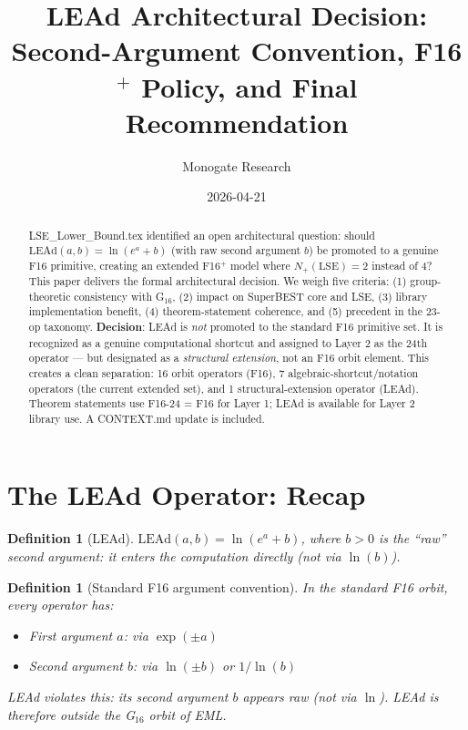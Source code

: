 \documentclass[11pt]{article}
\title{LEAd Architectural Decision:\\
Second-Argument Convention, F16$^+$ Policy, and Final Recommendation}
\author{Monogate Research}
\date{2026-04-21}
\newtheorem{definition}[theorem]{Definition}
\begin{document}
\maketitle

\begin{abstract}
LSE\_Lower\_Bound.tex identified an open architectural question:
should $\mathrm{LEAd}(a,b) = \ln(e^a + b)$ (with raw second argument $b$)
be promoted to a genuine F16 primitive, creating an extended F16$^+$ model
where $N_+(\mathrm{LSE}) = 2$ instead of 4?
This paper delivers the formal architectural decision.
We weigh five criteria: (1) group-theoretic consistency with G$_{16}$,
(2) impact on SuperBEST core and LSE, (3) library implementation benefit,
(4) theorem-statement coherence, and (5) precedent in the 23-op taxonomy.
\textbf{Decision}: LEAd is \emph{not} promoted to the standard F16 primitive set.
It is recognized as a genuine computational shortcut and assigned to Layer 2
as the 24th operator — but designated as a \emph{structural extension}, not an
F16 orbit element. This creates a clean separation: 16 orbit operators (F16),
7 algebraic-shortcut/notation operators (the current extended set), and 1
structural-extension operator (LEAd). Theorem statements use F16-24 = F16 for
Layer 1; LEAd is available for Layer 2 library use.
A CONTEXT.md update is included.
\end{abstract}

\section{The LEAd Operator: Recap}

\begin{definition}[LEAd]
$\mathrm{LEAd}(a, b) = \ln(e^a + b)$, where $b > 0$ is the ``raw'' second argument:
it enters the computation directly (not via $\ln(b)$).
\end{definition}

\begin{definition}[Standard F16 argument convention]
In the standard F16 orbit, every operator has:
\begin{itemize}
  \item First argument $a$: via $\exp(\pm a)$
  \item Second argument $b$: via $\ln(\pm b)$ or $1/\ln(b)$
\end{itemize}
LEAd violates this: its second argument $b$ appears raw (not via $\ln$).
LEAd is therefore outside the G$_{16}$ orbit of EML.
\end{definition}
\end{document}
